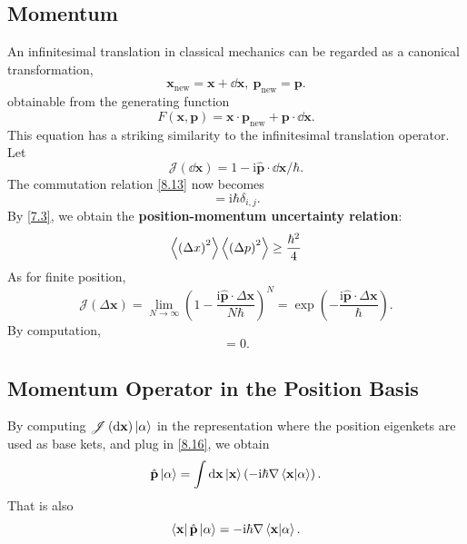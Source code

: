 \documentclass{article}
\theoremstyle{1}
\newcommand{\ii}{\mathrm{i}}
\begin{document}
\subsection{Momentum}
An infinitesimal translation in classical mechanics can be regarded as a canonical transformation,
\begin{equation}
    \mathbf{x}_{\text{new}}=\mathbf{x}+\dd{\mathbf{x}},\ \mathbf{p}_{\text{new}}=\mathbf{p}.
\end{equation}
obtainable from the generating function
\begin{equation}
    F(\mathbf{x},\mathbf{p})=\mathbf{x}\cdot\mathbf{p}_{\text{new}}+\mathbf{p}\cdot\dd{\mathbf{x}}.
\end{equation}
This equation has a striking similarity to the infinitesimal translation operator. Let 
\begin{equation}\label{8.16}
    \mathscr{J}(\dd{\mathbf{x}})=1-\ii\hat{\mathbf{p}}\cdot\dd{\mathbf{x}}/\hbar. 
\end{equation}
The commutation relation \eqref{8.13} now becomes
\begin{equation}
    [\hat{x}_i,\hat{p}_j]=\ii\hbar\delta_{i,j}.
\end{equation}
By \eqref{7.3}, we obtain the \textbf{position-momentum uncertainty relation}:
\begin{equation}
    \expval{\left(\Delta x\right)^2}\expval{\left(\Delta p\right)^2}\ge\frac{\hbar^2}{4}
\end{equation}
As for finite position\label{displacement operator}, 
\begin{equation}
    \mathscr{J}(\Delta \mathbf{x})=\lim_{N\rightarrow \infty}\left(1-\frac{\ii\hat{\mathbf{p}}\cdot\Delta\mathbf{x}}{N\hbar}\right)^N=\exp\left(-\frac{\ii\hat{\mathbf{p}}\cdot\Delta \mathbf{x}}{\hbar}\right).
\end{equation}
By computation,
\begin{equation}
    [\hat{p}_i,\hat{p}_j]=0.
\end{equation}
\subsection{Momentum Operator in the Position Basis}
By computing $\mathscr{J}\left(\dd{\mathbf{x}}\right)\ket{\alpha}$ in
the representation where the position eigenkets are used as base kets, and plug in \eqref{8.16}, we obtain 
\begin{equation}
    \hat{\mathbf{p}}\ket{\alpha}=\int \dd{\mathbf{x}}\ket{\mathbf{x}}\left(-\ii\hbar\nabla\bra{\mathbf{x}}\ket{\alpha}\right).
\end{equation}
That is also 
\begin{equation}\label{8.23}
    \bra{\mathbf{x}}\hat{\mathbf{p}}\ket{\alpha}=-\ii\hbar\nabla\braket{\mathbf{x}}{\alpha}.
\end{equation}
\end{document}
